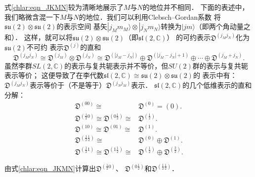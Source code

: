 式\eqref{chlar:eqn_JKMN}较为清晰地展示了$M$与$N$的地位并不相同．
下面的表述中，我们略微含混一下$M$与$N$的地位．我们可以利用Clebsch--Gordan系数
将$\mathfrak{su}(2)\otimes\mathfrak{su}(2)$的表示空间
基矢$|j_M m_M\rangle \otimes|j_N m_N\rangle$转换为$|jm \rangle$（即两个角动量之和）．
这样，就可以将$\mathfrak{su}(2)\otimes\mathfrak{su}(2)$（即$\mathfrak{sl}(2,\mathbb{C})$）
的可约表示$\mathfrak{D}^{(j_M j_N)}$化为$\mathfrak{su}(2)$不可约
表示$\mathfrak{D}^{(j)}$的直和\cite[\S 11.6]{taorb-2011-gt}
\begin{equation}\label{chlar:eqn_DLDU}
    \mathfrak{D}^{(j_M j_N)} \cong \mathfrak{D}^{(j_M)}\otimes\mathfrak{D}^{(j_N)} \cong
    \mathfrak{D}^{(|j_M- j_N|)}\oplus \mathfrak{D}^{(|j_M- j_N|+1)}
    \oplus \cdots \oplus \mathfrak{D}^{(j_M+ j_N)}.
\end{equation}
虽然李群$SL(2,\mathbb{C})$的表示与复共轭表示并不等价，但$SU(2)$群的表示与复共轭表示等价；
这便导致了在{\kaishu 李代数}$\mathfrak{sl}(2,\mathbb{C})\cong \mathfrak{su}(2)\otimes\mathfrak{su}(2)$的
表示中有：$\mathfrak{D}^{(j_M j_N)}$表示{\fangsong 等价于}（不是{\kaishu 等于}）$ \mathfrak{D}^{(j_N j_M)}$表示．
$\mathfrak{sl}(2,\mathbb{C})$的几个低维表示的直和分解：
\begin{align}
    \mathfrak{D}^{(00)} {\cong} &\mathfrak{D}^{(0)}= (0) . \label{chlar:eqn_D-scalar} \\
    \mathfrak{D}^{(\frac{1}{2}0)} \cong \mathfrak{D}^{(0\frac{1}{2})} {\cong}& \mathfrak{D}^{(\frac{1}{2})} . 
    \label{chlar:eqn_D-Weyl-Spinor} \\
    \mathfrak{D}^{(10)} \cong \mathfrak{D}^{(01)} {\cong}& \mathfrak{D}^{(1)} . \label{chlar:eqn_D0110}\\
    \mathfrak{D}^{(\frac{1}{2}\frac{1}{2})} {\cong} & \mathfrak{D}^{(0)}\oplus \mathfrak{D}^{(1)} . 
    \label{chlar:eqn_D-Vector} \\
    \mathfrak{D}^{(\frac{1}{2}1)} \cong \mathfrak{D}^{(1\frac{1}{2})} {\cong}&
       \mathfrak{D}^{(\frac{1}{2})}\oplus \mathfrak{D}^{(\frac{3}{2})} . 
\end{align}



\begin{exercise}
	由式\eqref{chlar:eqn_JKMN}计算出$\mathfrak{D}^{(\frac{1}{2}0)}$、
	$\mathfrak{D}^{(0\frac{1}{2})}$和$\mathfrak{D}^{(\frac{1}{2}\frac{1}{2})}$．
\end{exercise}




